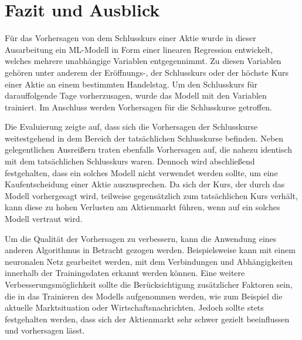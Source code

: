 \chapter{Fazit und Ausblick}\label{chp:fazit-und-ausblick}
Für das Vorhersagen von dem Schlusskurs einer Aktie wurde in dieser Ausarbeitung ein ML-Modell in Form einer linearen Regression entwickelt, welches mehrere unabhängige Variablen entgegennimmt. Zu diesen Variablen gehören unter anderem der Eröffnungs-, der Schlusskurs oder der höchste Kurs einer Aktie an einem bestimmten Handelstag. Um den Schlusskurs für darauffolgende Tage vorherzusagen, wurde das Modell mit den Variablen trainiert. Im Anschluss werden Vorhersagen für die Schlusskurse getroffen.

Die Evaluierung zeigte auf, dass sich die Vorhersagen der Schlusskurse weitestgehend in dem Bereich der tatsächlichen Schlusskurse befinden. Neben gelegentlichen Ausreißern traten ebenfalls Vorhersagen auf, die nahezu identisch mit dem tatsächlichen Schlusskurs waren. Dennoch wird abschließend festgehalten, dass ein solches Modell nicht verwendet werden sollte, um eine Kaufentscheidung einer Aktie auszusprechen. Da sich der Kurs, der durch das Modell vorhergesagt wird, teilweise gegensätzlich zum tatsächlichen Kurs verhält, kann diese zu hohen Verlusten am Aktienmarkt führen, wenn auf ein solches Modell vertraut wird.

Um die Qualität der Vorhersagen zu verbessern, kann die Anwendung eines anderen Algorithmus in Betracht gezogen werden. Beispielsweise kann mit einem neuronalen Netz gearbeitet werden, mit dem Verbindungen und Abhängigkeiten innerhalb der Trainingsdaten erkannt werden können. 
Eine weitere Verbesserungsmöglichkeit sollte die Berücksichtigung zusätzlicher Faktoren sein, die in das Trainieren des Modells aufgenommen werden, wie zum Beispiel die aktuelle Marktsituation oder Wirtschaftsnachrichten. Jedoch sollte stets festgehalten werden, dass sich der Aktienmarkt sehr schwer gezielt beeinflussen und vorhersagen lässt.
